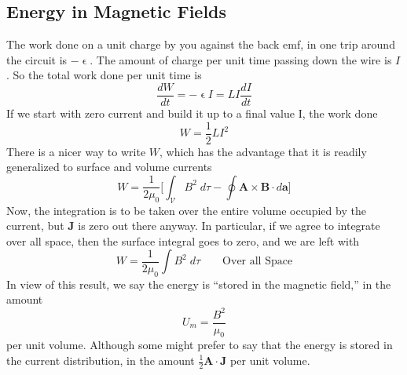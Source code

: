\documentclass[../../../main.tex]{subfiles}
\begin{document}
\subsection{Energy in Magnetic Fields}
The work done on a unit charge by you against the back emf, in one trip around the circuit is $-\upvarepsilon$. The amount of charge per unit time passing down the wire is $I $. So the total work done per unit time is
\begin{equation*}
    \frac{dW}{dt}=-\upvarepsilon I=LI\frac{dI}{dt}
\end{equation*}
If we start with zero current and build it up to a ﬁnal value I, the work done
\begin{equation*}
    W=\frac{1}{2}LI^2
\end{equation*}
There is a nicer way to write $W$, which has the advantage that it is readily generalized to surface and volume currents
\begin{equation*}
    W=\frac{1}{2\mu_0}\bigg[\int_\mathcal{V} B^2\;d\tau-\oint \mathbf{A}\times \mathbf{B}\cdot d\mathbf{a}\bigg]
\end{equation*}
Now, the integration is to be taken over the entire volume occupied by the current, but \textbf{J} is zero out there anyway. In particular, if we agree to integrate over all space, then the surface integral goes to zero, and we are left with
\begin{equation*}
    W=\frac{1}{2\mu_0}\int B^2 \;d\tau\qquad\text{Over all Space}
\end{equation*}
In view of this result, we say the energy is “stored in the magnetic ﬁeld,” in the amount
\begin{equation*}
    U_m=\frac{B^2}{\mu_0}
\end{equation*}
per unit volume. Although some might prefer to say that the energy is stored in the current distribution, in the amount $\frac{1}{2}\mathbf{A}\cdot\mathbf{J}$ per unit volume.
\end{document}
